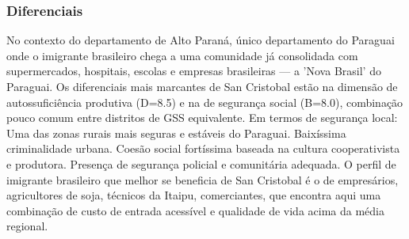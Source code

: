 \subsubsection*{Diferenciais}\label{dif-san-cristobal-1012}
No contexto do departamento de Alto Paraná, único departamento do Paraguai onde o imigrante brasileiro chega a uma comunidade já consolidada com supermercados, hospitais, escolas e empresas brasileiras — a 'Nova Brasil' do Paraguai. Os diferenciais mais marcantes de San Cristobal estão na dimensão de autossuficiência produtiva (D=8.5) e na de segurança social (B=8.0), combinação pouco comum entre distritos de GSS equivalente. Em termos de segurança local: Uma das zonas rurais mais seguras e estáveis do Paraguai. Baixíssima criminalidade urbana. Coesão social fortíssima baseada na cultura cooperativista e produtora. Presença de segurança policial e comunitária adequada. O perfil de imigrante brasileiro que melhor se beneficia de San Cristobal é o de empresários, agricultores de soja, técnicos da Itaipu, comerciantes, que encontra aqui uma combinação de custo de entrada acessível e qualidade de vida acima da média regional.
